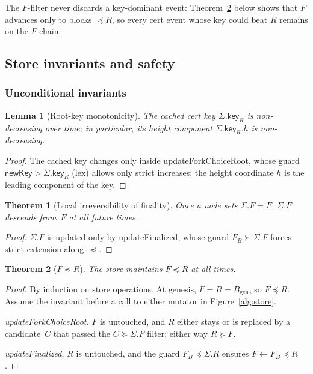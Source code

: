 \ifx\litemode\undefined\documentclass{article}\fi
\newcommand{\genesis}{\ensuremath{B_{\mathrm{gen}}}}
\newcommand{\key}{\mathsf{key}}
\newcommand{\newKey}{\mathsf{newKey}}
\newcommand{\updateForkChoiceRoot}{\textsf{updateForkChoiceRoot}\xspace}
\newcommand{\updateFinalized}{\textsf{updateFinalized}\xspace}
\theoremstyle{plain}
\newtheorem{theorem}{Theorem}
\newtheorem{lemma}{Lemma}
\theoremstyle{definition}
\theoremstyle{remark}
\begin{document}
The $F$-filter never discards a key-dominant event: Theorem~\ref{thm:fleqr} below shows that $F$ advances only to blocks $\preceq R$, so every cert event whose key could beat $R$ remains on the $F$-chain.

\subsection{Store invariants and safety}

\subsubsection*{Unconditional invariants}

\begin{lemma}[Root-key monotonicity]\label{lem:Rs-key-monotone}
The cached cert key $\Sigma.\key_R$ is non-decreasing over time; in particular, its height component $\Sigma.\key_R.h$ is non-decreasing.
\end{lemma}

\begin{proof}
The cached key changes only inside \updateForkChoiceRoot, whose guard $\newKey > \Sigma.\key_R$ (lex) allows only strict increases; the height coordinate $h$ is the leading component of the key.
\end{proof}

\begin{theorem}[Local irreversibility of finality]\label{thm:finperm}
Once a node sets $\Sigma.F = F$, $\Sigma.F$ descends from~$F$ at all future times.
\end{theorem}

\begin{proof}
$\Sigma.F$ is updated only by \updateFinalized, whose guard $F_B \succ \Sigma.F$ forces strict extension along~$\preceq$.
\end{proof}

\begin{theorem}[$F \preceq R$]\label{thm:fleqr}
The store maintains $F \preceq R$ at all times.
\end{theorem}

\begin{proof}
By induction on store operations.
At genesis, $F = R = \genesis$, so $F \preceq R$.
Assume the invariant before a call to either mutator in Figure~\ref{alg:store}.

\emph{\updateForkChoiceRoot.}
$F$ is untouched, and $R$ either stays or is replaced by a candidate~$C$ that passed the $C \succeq \Sigma.F$ filter; either way $R \succeq F$.

\emph{\updateFinalized.}
$R$ is untouched, and the guard $F_B \preceq \Sigma.R$ ensures $F \gets F_B \preceq R$.
\end{proof}
\end{document}
